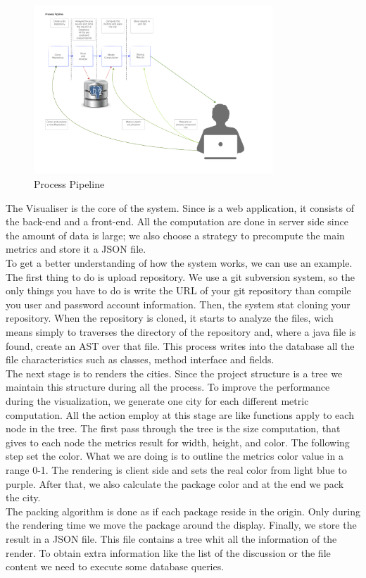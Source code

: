 \documentclass[]{usiinfbachelorproject}
\begin{document}
\begin{figure}[H]
	\centering
	\includegraphics[width=0.8\textwidth]{images/processPipeline}
	
	\caption[Process Pipeline]{Process Pipeline\label{fig:processPipeline}}

\end{figure}

The Visualiser is the core of the system. Since is a web application, it consists of the back-end and a front-end. All the computation are done in server side since the amount of data is large; we also choose a strategy to precompute the main metrics and store it a JSON file.\\
To get a better understanding of how the system works, we can use an example. The first thing to do is upload repository. We use a git subversion system, so the only things you have to do is write the URL of your git repository than compile you user and password account information. Then, the system stat cloning your repository. When the repository is cloned, it starts to analyze the files, wich means simply to traverses the directory of the repository and, where a java file is found, create an AST over that file. This process writes into the database all the file characteristics such as classes, method interface and fields.\\
The next stage is to renders the cities. Since the project structure is a tree we maintain this structure during all the process. To improve the performance during the visualization, we generate one city for each different metric computation. All the action employ at this stage are like functions apply to each node in the tree. The first pass through the tree is the size computation, that gives to each node the metrics result for width, height, and color. The following step set the color. What we are doing is to outline the metrics color value in a range 0-1. The rendering is client side and sets the real color from light blue to purple. After that, we also calculate the package color and at the end we pack the city.\\
The packing algorithm is done as if each package reside in the origin. Only during the rendering time we move the package around the display. Finally, we store the result in a JSON file. This file contains a tree whit all the information of the render. To obtain extra information like the list of the discussion or the file content we need to execute some database queries.\\
\end{document}
